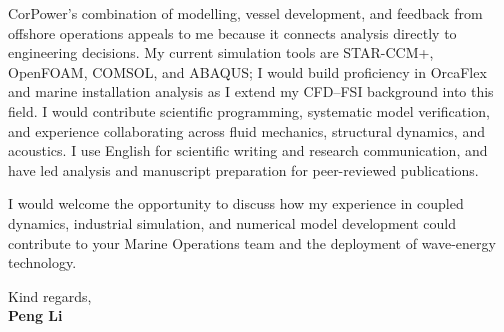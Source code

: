 \documentclass[a4paper,11pt]{article}
\begin{document}
CorPower's combination of modelling, vessel development, and feedback from offshore
operations appeals to me because it connects analysis directly to engineering decisions.
My current simulation tools are STAR-CCM+, OpenFOAM, COMSOL, and ABAQUS;
I would build proficiency in OrcaFlex and marine installation analysis as I extend my
CFD--FSI background into this field. I would contribute scientific programming, systematic
model verification, and experience collaborating across fluid mechanics, structural dynamics,
and acoustics. I use English for scientific writing and research communication, and have
led analysis and manuscript preparation for peer-reviewed publications.

I would welcome the opportunity to discuss how my experience in coupled dynamics,
industrial simulation, and numerical model development could contribute to your Marine
Operations team and the deployment of wave-energy technology.

Kind regards,\\[3pt]
\textbf{Peng Li}
\end{document}
